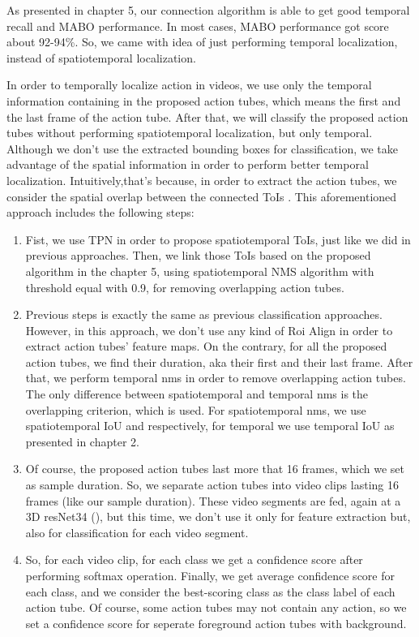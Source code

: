 \documentclass{report}
\begin{document}
As presented in chapter 5, our connection algorithm is able to get good temporal recall and MABO performance. In most cases, MABO performance
got score about 92-94\%. So, we came with idea of just performing temporal localization, instead of spatiotemporal localization. \par
In order to temporally localize action in videos, we use only the temporal information containing in the proposed action tubes, which means the first and the last frame of the action tube.
After that, we will classify the proposed action tubes without performing spatiotemporal localization, but only temporal. Although we don't use the extracted bounding boxes for classification, we take advantage of the spatial information in order to perform better temporal localization. Intuitively,that's because, in order to extract the action tubes, we consider the spatial overlap between the connected ToIs . This aforementioned approach includes the following steps:
\begin{enumerate}
\item Fist, we use TPN in order to propose  spatiotemporal ToIs, just like we did in previous approaches. Then, we link those ToIs based
  on the proposed algorithm in the chapter 5, using spatiotemporal NMS algorithm with threshold equal with 0.9, for removing overlapping action tubes.
\item Previous steps is exactly the same as previous classification approaches. However, in this approach, we don't use any kind of Roi Align
  in order to extract action tubes' feature maps. On the contrary, for all the proposed action tubes, we find their duration, aka their first
  and their last frame. After that, we perform temporal nms in order to remove overlapping action tubes. The only difference between
  spatiotemporal and temporal nms is the overlapping criterion, which is used. For spatiotemporal nms, we use spatiotemporal IoU and
  respectively, for temporal we use temporal IoU as presented in chapter 2.
\item Of course, the proposed action tubes last more that 16 frames, which we set as sample duration. So, we separate action tubes into
  video clips lasting 16 frames (like our sample duration). These video segments are fed, again at a 3D resNet34 (\cite{hara3dcnns}),
  but this time, we don't use it only for feature extraction but, also for classification for each video segment.
\item So, for each video clip, for each class we get a confidence score after performing softmax operation. Finally, we get
  average confidence score for each class, and we consider the best-scoring class as the class label of each action tube.
  Of course, some action tubes may not contain any action, so we set a confidence score for seperate foreground action tubes with
  background.
\end{enumerate}
\end{document}

